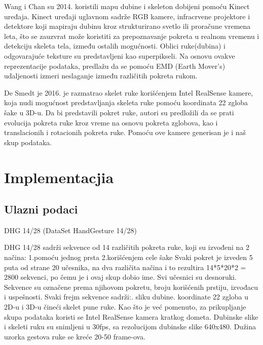 \documentclass{article}
\begin{document}
Wang i Chan su 2014. koristili mapu dubine i skeleton dobijeni pomoću Kinect uređaja. Kinect uređaji uglavnom sadrže RGB kamere, infracrvene projektore i detektore koji mapiraju dubinu kroz strukturirano svetlo ili proračune vremena leta, što se zauzvrat može koristiti za prepoznavanje pokreta u realnom vremenu i detekciju skeleta tela, između ostalih mogućnosti. Oblici ruke(dubina) i odgovarajuće teksture su predstavljeni kao superpikseli. Na osnovu ovakve reprezentacije podataka, predlažu da se pomoću EMD (Earth Mover's) udaljenosti izmeri neslaganje između različitih pokreta rukom.

De Smedt je 2016. je razmatrao skelet ruke korišćenjem Intel RealSense kamere, koja nudi mogućnost predstavljanja skeleta ruke pomoću koordinata 22 zgloba šake u 3D-u. Da bi predstavili pokret ruke, autori su predložili da se prati evolucija pokreta ruke kroz vreme na osnovu pokreta zglobova, kao i translacionih i rotacionih pokreta ruke. Pomoću ove kamere generisan je i naš skup podataka.



\section{Implementacjia}

\subsection{Ulazni podaci}
DHG 14/28 (DataSet HandGesture 14/28)\newline

DHG 14/28 sadrži sekvence od 14 različitih pokreta ruke, koji su izvođeni na 2 načina:\newline
1.pomoću jednog prsta\newline
2.korišćenjem cele šake\newline
Svaki pokret je izveden 5 puta od strane 20 učesnika, na dva različita načina i to rezultira 14*5*20*2 = 2800 sekvenci, po čemu je i ovaj skup dobio ime. Svi učesnici su desnoruki. Sekvence su označene prema njihovom pokretu, broju korišćenih prstiju, izvođacu i uspešnosti.\newline
Svaki frejm sekvence sadrži:. sliku dubine. koordinate 22 zgloba u 2D-u i 3D-u čineći skelet pune ruke.\newline
Kao što je već pomenuto, za prikupljanje skupa podataka koristi se Intel RealSense kamera kratkog dometa. Dubinske slike i skeleti ruku su snimljeni u 30fps, sa rezolucijom dubinske slike 640x480. Dužina uzorka gestova ruke se kreće 20-50 frame-ova.\break
\end{document}
